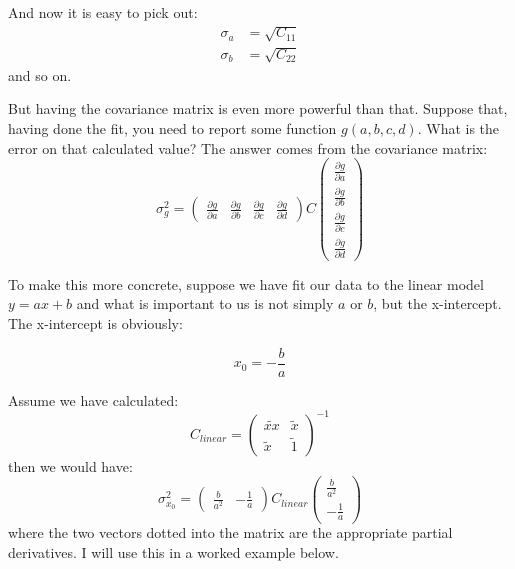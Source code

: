 \documentclass[letterpaper,12pt]{article}
\newcommand{\myMatrix}[1]{\bm{\mathit{#1}}}
\begin{document}
And now it is easy to pick out:
\begin{equation} \label{eq.ab.errors}
\begin{aligned}
\sigma_a&=\sqrt{\myMatrix{C}_{11}} \\
\sigma_b&=\sqrt{\myMatrix{C}_{22}} 
\end{aligned}
\end{equation}
and so on.

But having the covariance matrix is even more powerful than that. Suppose that, having done the fit, you need to report some function $g(a,b,c,d)$. What is the error on that calculated value? The answer comes from the covariance matrix:
\begingroup
\renewcommand*{\arraystretch}{1.5}
\begin{equation}
\sigma_g^2=
\begin{pmatrix}
\frac{\partial g}{\partial a} &\frac{\partial g}{\partial b} &\frac{\partial g}{\partial c} &\frac{\partial g}{\partial d} 
\end{pmatrix}
\myMatrix{C}
\begin{pmatrix}
\frac{\partial g}{\partial a} \\
\frac{\partial g}{\partial b} \\
\frac{\partial g}{\partial c} \\
\frac{\partial g}{\partial d} 
\end{pmatrix}
\end{equation}
\endgroup

To make this more concrete, suppose we have fit our data to the linear model $y=ax+b$ and what is important to us is not simply $a$ or $b$, but the x-intercept. The x-intercept is obviously:

\begin{equation} \label{eq.x.intercept}
x_0=-\frac{b}{a}
\end{equation}

Assume we have calculated:
\begin{equation} \label{eq.clinear}
\myMatrix{C}_{linear}=
\begin{pmatrix}
\widetilde{xx} & \widetilde{x} \\
\widetilde{x} & \widetilde{1}
\end{pmatrix} ^{-1}
\end{equation}
then we would have:
\begingroup
\renewcommand*{\arraystretch}{1.5}
\begin{equation} \label{eq.intercept.error}
\sigma_{x_0}^2=\begin{pmatrix}
\frac{b}{a^2} & -\frac{1}{a}
\end{pmatrix}
\myMatrix{C}_{linear}
\begin{pmatrix}
\frac{b}{a^2} \\
-\frac{1}{a}
\end{pmatrix}
\end{equation}
\endgroup
where the two vectors dotted into the matrix are the appropriate partial derivatives. I will use this in a worked example below.
\end{document}
